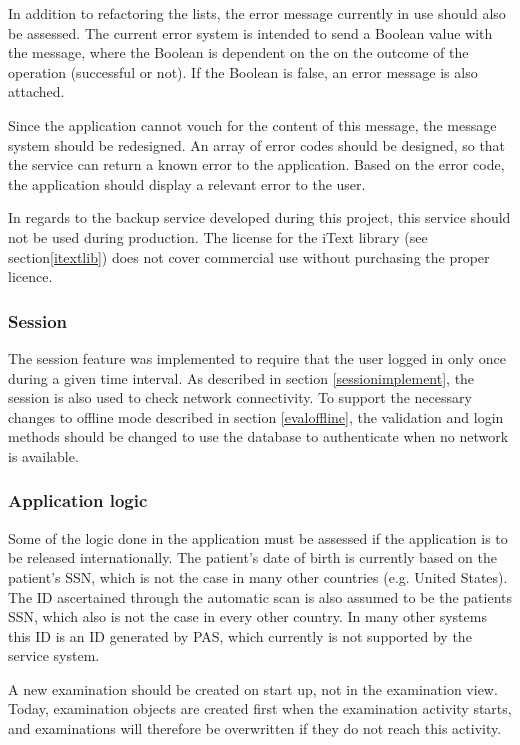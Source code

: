 In addition to refactoring the lists, the error message currently in use should also be assessed. The current error system is intended to send a Boolean value with the message, where the Boolean is dependent on the on the outcome of the operation (successful or not). If the Boolean is false, an error message is also attached. 

Since the application cannot vouch for the content of this message, the message system should be redesigned. An array of error codes should be designed, so that the service can return a known error to the application. Based on the error code, the application should display a relevant error to the user. 

In regards to the backup service developed during this project, this service should not be used during production. The license for the iText library (see section\ref{itextlib}) does not cover commercial use without purchasing the proper licence.

\subsubsection{Session}
The session feature was implemented to require that the user logged in only once during a given time interval. As described in section \ref{sessionimplement}, the session is also used to check network connectivity. To support the necessary changes to offline mode described in section \ref{evaloffline}, the validation and login methods should be changed to use the database to authenticate when no network is available.

\subsubsection{Application logic}
Some of the logic done in the application must be assessed if the application is to be released internationally. The patient's date of birth is currently based on the patient's SSN, which is not the case in many other countries (e.g. United States). The ID ascertained through the automatic scan is also assumed to be the patients SSN, which also is not the case in every other country. In many other systems this ID is an ID generated by PAS, which currently is not supported by the service system. 

A new examination should be created on start up, not in the examination view. Today, examination objects are created first when the examination activity starts, and examinations will therefore be overwritten if they do not reach this activity. 

